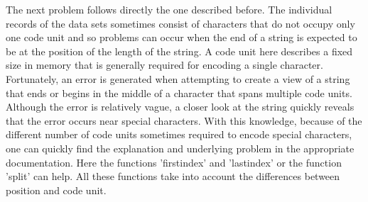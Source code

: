 The next problem follows directly the one described before. The individual records of the data sets sometimes consist of characters that do not occupy only one code unit and so problems can occur when the end of a string is expected to be at the position of the length of the string. A code unit here describes a fixed size in memory that is generally required for encoding a single character. Fortunately, an error is generated when attempting to create a view of a string that ends or begins in the middle of a character that spans multiple code units. Although the error is relatively vague, a closer look at the string quickly reveals that the error occurs near special characters. With this knowledge, because of the different number of code units sometimes required to encode special characters, one can quickly find the explanation and underlying problem in the appropriate documentation. Here the functions 'firstindex' and 'lastindex' or the function 'split' can help. All these functions take into account the differences between position and code unit. 

